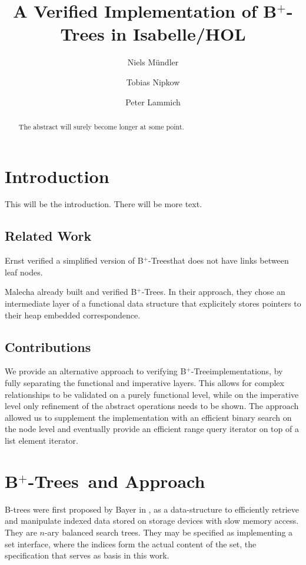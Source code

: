 \documentclass[a4paper,UKenglish,cleveref, autoref, thm-restate]{lipics-v2021}
\title{A Verified Implementation of B$^+$-Trees in Isabelle/HOL} %
\author{Niels Mündler}{Department of Computer Science, ETH Zurich, Switzerland}{n.muendler@tum.de}{https://orcid.org/0000-0003-3851-2557}{}%
\author{Tobias Nipkow}{Department of Informatics, Technical University of Munich, Germany}{nipkow@in.tum.de}{https://orcid.org/0000-0003-0730-515X}{}
\author{Peter Lammich}{Department of Computer Science, The University of Manchester, Great-Britain}{lammich@in.tum.de}{https://orcid.org/0000-0003-3576-0504}{}
\newcommand{\btree}{B$^+$-Tree}
\newcommand{\btrees}{B$^+$-Trees}
\begin{document}
\maketitle

\begin{abstract}
    The abstract will surely become longer at some point.
\end{abstract}

\section{Introduction}
\label{sec:introduction}

This will be the introduction. There will be more text.

\subsection{Related Work}
\label{sec:related_work}

Ernst verified a simplified version of \btrees that does
not have links between leaf nodes.

Malecha already built and verified \btrees \cite{}.
In their approach, they chose an intermediate layer of a functional
data structure that explicitely stores pointers to their heap embedded
correspondence.

\subsection{Contributions}
\label{sec:contributions}

We provide an alternative approach to verifying \btree implementations,
by fully separating the functional and imperative layers.
This allows for complex relationships to be validated on a purely
functional level, while on the imperative level
only refinement of the abstract operations needs to be shown.
The approach allowed us to supplement the implementation
with an efficient binary search on the node level
and eventually provide an efficient range query iterator
on top of a list element iterator.


\section{\btrees\ and Approach}
\label{sec:approach}

B-trees were first proposed by Bayer in \cite{DBLP:journals/acta/BayerM72},
as a data-structure to efficiently retrieve and manipulate
indexed data stored on storage devices with slow memory access.
They are $n$-ary balanced search trees.
They may be specified as implementing a set interface,
where the indices form the actual content of the set,
the specification that serves as basis in this work.
\end{document}
